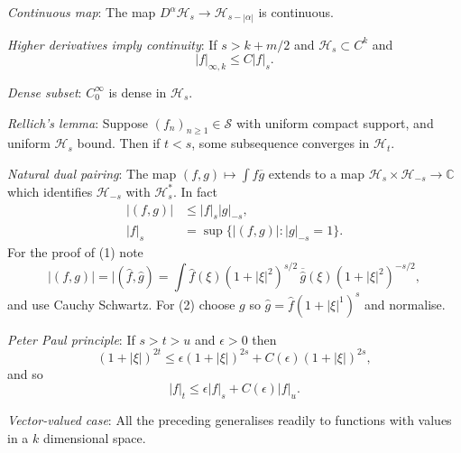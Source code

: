 \documentclass[a4paper]{amsbook}
\theoremstyle{plain}
\theoremstyle{definition}
\theoremstyle{remark}
\begin{document}
  
  \medskip  \emph{Continuous map}: The map $ D^ \alpha \mathcal{H} _s \to \mathcal{H} _{s- | \alpha | }$ is continuous.
  
\medskip \emph{Higher derivatives imply continuity}:  If $ s > k + m/2 $ and $  \mathcal{H}_s  \subset C^k $ and
\[
|f|_{\infty,k} \leq C |f|_s .
\]

\medskip \emph{Dense subset}:  $ C_0^\infty  $ is dense in $ \mathcal{H}_s $.

\medskip \emph{Rellich's lemma}:  Suppose $ (f_n)_{n\geq 1} \in \mathcal{S} $ with uniform compact support, and uniform $ \mathcal{H}_s $ bound.  Then if $ t < s $, some subsequence converges in $ \mathcal{H}_t $.


\medskip \emph{Natural dual pairing}: The map $ (f,g) \mapsto \int f\overline{g} $ extends to a map $ \mathcal{H}_s \times \mathcal{H}_{-s} \to \mathbb{C} $ which identifies $ \mathcal{H}_{-s} $ with $ \mathcal{H}_s^* $.  In fact
\begin{align*}
|(f,g)| & \leq |f|_s |g|_{-s},\\
|f|_s &= \sup \{ |(f,g)| : |g|_{-s} = 1 \}.
\end{align*}
For the proof of (1) note 
\[
|(f,g)| = |(\hat{f},\hat{g}) = \int \hat{f}(\xi) (1+|\xi|^2)^{s/2}\,  \overline{\hat{g}}(\xi) (1+|\xi|^2)^{-s/2},
\]
and use Cauchy Schwartz.  For (2) choose $ g $ so $ \hat{g} = \hat{f}(1+|\xi |^1)^s $ and normalise.

\medskip \emph{Peter Paul principle}: If $ s>t>u $ and $ \epsilon > 0 $ then 
\[
(1+|\xi|)^{2t} \leq \epsilon (1+|\xi|)^{2s} +  C(\epsilon) (1+|\xi|)^{2s},
\]
and so  
\[
|f|_t \leq \epsilon |f|_s + C(\epsilon) |f|_u.
\]

\medskip \emph{Vector-valued case}:  All the preceding generalises readily to functions with values in a $ k $ dimensional space.










%

\end{document}

